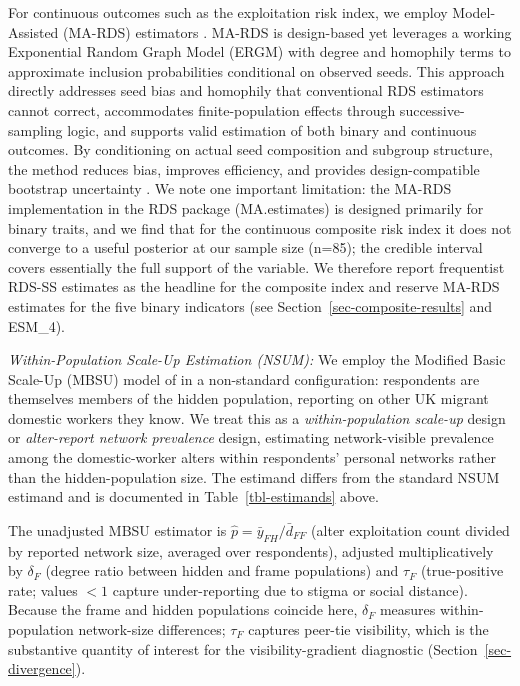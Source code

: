 \documentclass[
  12pt,
  letterpaper,
  DIV=11,
  numbers=noendperiod]{scrartcl}
\begin{document}
For continuous outcomes such as the exploitation risk index, we employ
Model-Assisted (MA-RDS) estimators \autocite{gile15-network}. MA-RDS is
design-based yet leverages a working Exponential Random Graph Model
(ERGM) with degree and homophily terms to approximate inclusion
probabilities conditional on observed seeds. This approach directly
addresses seed bias and homophily that conventional RDS estimators
cannot correct, accommodates finite-population effects through
successive-sampling logic, and supports valid estimation of both binary
and continuous outcomes. By conditioning on actual seed composition and
subgroup structure, the method reduces bias, improves efficiency, and
provides design-compatible bootstrap uncertainty
\autocite{gile11-improved}. We note one important limitation: the MA-RDS
implementation in the RDS package (MA.estimates) is designed primarily
for binary traits, and we find that for the continuous composite risk
index it does not converge to a useful posterior at our sample size
(n=85); the credible interval covers essentially the full support of the
variable. We therefore report frequentist RDS-SS estimates as the
headline for the composite index and reserve MA-RDS estimates for the
five binary indicators (see Section~\ref{sec-composite-results} and
ESM\_4).

\emph{Within-Population Scale-Up Estimation (NSUM):} We employ the
Modified Basic Scale-Up (MBSU) model of \textcite{feeh16-generalizing}
in a non-standard configuration: respondents are themselves members of
the hidden population, reporting on other UK migrant domestic workers
they know. We treat this as a \emph{within-population scale-up} design
\autocite[supplementary materials]{feeh16-generalizing} or
\emph{alter-report network prevalence} design, estimating
network-visible prevalence among the domestic-worker alters within
respondents' personal networks rather than the hidden-population size.
The estimand differs from the standard NSUM estimand and is documented
in Table~\ref{tbl-estimands} above.

The unadjusted MBSU estimator is
\(\hat{p} = \bar{y}_{FH} / \bar{d}_{FF}\) (alter exploitation count
divided by reported network size, averaged over respondents), adjusted
multiplicatively by \(\delta_F\) (degree ratio between hidden and frame
populations) and \(\tau_F\) (true-positive rate; values \(< 1\) capture
under-reporting due to stigma or social distance). Because the frame and
hidden populations coincide here, \(\delta_F\) measures
within-population network-size differences; \(\tau_F\) captures peer-tie
visibility, which is the substantive quantity of interest for the
visibility-gradient diagnostic (Section~\ref{sec-divergence}).
\end{document}
